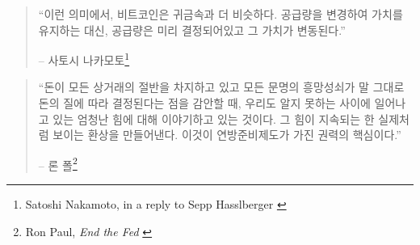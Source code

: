 \begin{quotation}\begin{samepage}
		\enquote{이런 의미에서, 비트코인은 귀금속과 더 비슷하다. 
		공급량을 변경하여 가치를 유지하는 대신, 공급량은 미리 결정되어있고 그 가치가 변동된다.}
		\begin{flushright} -- 사토시 나카모토\footnote{Satoshi Nakamoto, in a reply to Sepp
				Hasslberger \cite{satoshi-precious-metal}}
\end{flushright}\end{samepage}\end{quotation}


\begin{comment}
	인간은 게으른 동물이기 때문에 당장 잘 작동하는 것에 대해서는 별로 걱정하지 않는다. 
	우리 대부분에게 돈은 잘 작동한다.
	대부분의 사람들은 자동차나 컴퓨터처럼 고장이 난 경우에만 내부 작동 원리를 생각하게 된다.
	초인플레이션으로 인해 일생을 바쳐 모은 저축이 사라지는 것을 본 사람들은 경화(hard money)의 가치를 
	잘 알고 있다. 마치 나치 독일이나 소련 러시아의 잔혹 행위로 인해 친구와 가족의 죽음을 경험한 사람들이 프라이버시의 가치를 아는 것과 같다.
\end{comment}

\begin{comment}
	돈은 우리의 모든 생활에 영향을 끼친다는 것이 문제이다. 
	돈은 일상의 거래에 절반을 차지하고 있고, 
	돈을 만드는 일을 담당하는 사람들은 엄청난 힘을 가지고 있다.
\end{comment}

\begin{quotation}\begin{samepage}
		\enquote{돈이 모든 상거래의 절반을 차지하고 있고
			모든 문명의 흥망성쇠가 말 그대로 돈의 질에 따라 결정된다는 점을 감안할 때,
			우리도 알지 못하는 사이에 일어나고 있는 엄청난 힘에 대해 이야기하고 있는 것이다.
			그 힘이 지속되는 한 실제처럼 보이는 환상을 만들어낸다.
			이것이 연방준비제도가 가진 권력의 핵심이다.}
		\begin{flushright} -- 론 폴\footnote{Ron Paul, \textit{End the Fed} \cite{end-the-fed}}
\end{flushright}\end{samepage}\end{quotation}

